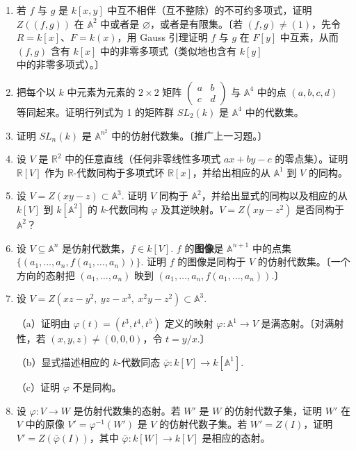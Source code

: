 \begin{enumerate}
\item 若 \(f\) 与 \(g\) 是 \(k[x,y]\) 中互不相伴（互不整除）的不可约多项式，证明 \(Z((f,g))\) 在 \(\mathbb{A}^2\) 中或者是 \(\varnothing\)，或者是有限集。〔若 \((f,g) \neq (1)\)，先令 \(R = k[x]\)、\(F = k(x)\)，用 Gauss 引理证明 \(f\) 与 \(g\) 在 \(F[y]\) 中互素，从而 \((f,g)\) 含有 \(k[x]\) 中的非零多项式（类似地也含有 \(k[y]\) 中的非零多项式）。〕

\item 把每个以 \(k\) 中元素为元素的 \(2 \times 2\) 矩阵 \(\begin{pmatrix}a & b\\ c & d\end{pmatrix}\) 与 \(\mathbb{A}^4\) 中的点 \((a,b,c,d)\) 等同起来。证明行列式为 1 的矩阵群 \(SL_2(k)\) 是 \(\mathbb{A}^4\) 中的代数集。

\item 证明 \(SL_n(k)\) 是 \(\mathbb{A}^{n^2}\) 中的仿射代数集。〔推广上一习题。〕

\item 设 \(V\) 是 \(\mathbb{R}^2\) 中的任意直线（任何非零线性多项式 \(ax+by-c\) 的零点集）。证明 \(\mathbb{R}[V]\) 作为 \(\mathbb{R}\)-代数同构于多项式环 \(\mathbb{R}[x]\)，并给出相应的从 \(\mathbb{A}^1\) 到 \(V\) 的同构。

\item 设 \(V = Z(xy-z) \subset \mathbb{A}^3\). 证明 \(V\) 同构于 \(\mathbb{A}^2\)，并给出显式的同构以及相应的从 \(k[V]\) 到 \(k[\mathbb{A}^2]\) 的 \(k\)-代数同构 \(\varphi\) 及其逆映射。\(V = Z(xy-z^2)\) 是否同构于 \(\mathbb{A}^2\)？

\item 设 \(V \subseteq \mathbb{A}^n\) 是仿射代数集，\(f \in k[V]\). \(f\) 的\textbf{图像}是 \(\mathbb{A}^{n+1}\) 中的点集 \(\{(a_1, \ldots, a_n, f(a_1, \ldots, a_n))\}\). 证明 \(f\) 的图像是同构于 \(V\) 的仿射代数集。〔一个方向的态射把 \((a_1, \ldots, a_n)\) 映到 \((a_1, \ldots, a_n, f(a_1, \ldots, a_n))\).〕

\item 设 \(V = Z(xz-y^2,\ yz-x^3,\ x^2y-z^2) \subset \mathbb{A}^3\).

（a）证明由 \(\varphi(t) = (t^3, t^4, t^5)\) 定义的映射 \(\varphi : \mathbb{A}^1 \to V\) 是满态射。〔对满射性，若 \((x,y,z) \neq (0,0,0)\)，令 \(t = y/x\).〕

（b）显式描述相应的 \(k\)-代数同态 \(\bar\varphi : k[V] \to k[\mathbb{A}^1]\).

（c）证明 \(\varphi\) 不是同构。

\item 设 \(\varphi : V \to W\) 是仿射代数集的态射。若 \(W'\) 是 \(W\) 的仿射代数子集，证明 \(W'\) 在 \(V\) 中的原像 \(V' = \varphi^{-1}(W')\) 是 \(V\) 的仿射代数子集。若 \(W' = Z(I)\)，证明 \(V' = Z(\bar\varphi(I))\)，其中 \(\bar\varphi : k[W] \to k[V]\) 是相应的态射。


\end{enumerate}
